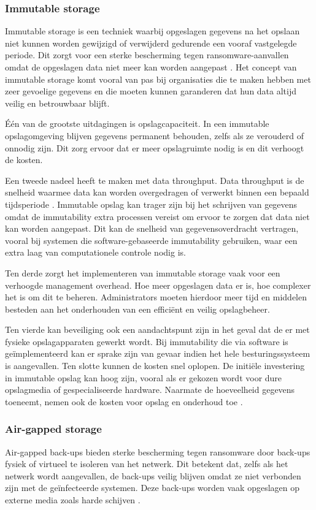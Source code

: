 \subsubsection{Immutable storage}
Immutable storage is een techniek waarbij opgeslagen gegevens na het opslaan niet kunnen worden gewijzigd of verwijderd gedurende een vooraf vastgelegde periode. Dit zorgt voor een sterke bescherming tegen ransomware-aanvallen omdat de opgeslagen data niet meer kan worden aangepast \autocite{Wahl2023}. Het concept van immutable storage komt vooral van pas bij organisaties die te maken hebben met zeer gevoelige gegevens en die moeten kunnen garanderen dat hun data altijd veilig en betrouwbaar blijft. 

Één van de grootste uitdagingen is opslagcapaciteit. In een immutable opslagomgeving blijven gegevens permanent behouden, zelfs als ze verouderd of onnodig zijn. Dit zorg ervoor dat er meer opslagruimte nodig is en dit verhoogt de kosten. 

Een tweede nadeel heeft te maken met data throughput. Data throughput is de snelheid waarmee data kan worden overgedragen of verwerkt binnen een bepaald tijdsperiode \autocite{Miao2016}. Immutable opslag kan trager zijn bij het schrijven van gegevens omdat de immutability extra processen vereist om ervoor te zorgen dat data niet kan worden aangepast. Dit kan de snelheid van gegevensoverdracht vertragen, vooral bij systemen die software-gebaseerde immutability gebruiken, waar een extra laag van computationele controle nodig is. 

Ten derde zorgt het implementeren  van immutable storage vaak voor een verhoogde management overhead. Hoe meer opgeslagen data er is, hoe complexer het is om dit te beheren. Administrators moeten hierdoor meer tijd en middelen besteden aan het onderhouden van een efficiënt en veilig opslagbeheer. 

Ten vierde kan beveiliging ook een aandachtspunt zijn in het geval dat de er met fysieke opslagapparaten gewerkt wordt. Bij immutability die via software is geïmplementeerd kan er sprake zijn van gevaar indien het hele besturingssysteem is aangevallen. Ten slotte kunnen de kosten snel oplopen. De initiële investering in immutable opslag kan hoog zijn, vooral als er gekozen wordt voor dure opslagmedia of gespecialiseerde hardware. Naarmate de hoeveelheid gegevens toeneemt, nemen ook de kosten voor opslag en onderhoud toe \autocite{Hasan2005}.

\subsubsection{Air-gapped storage}
Air-gapped back-ups bieden sterke bescherming tegen ransomware door back-ups fysiek of virtueel te isoleren van het netwerk. Dit betekent dat, zelfs als het netwerk wordt aangevallen, de back-ups veilig blijven omdat ze niet verbonden zijn met de geïnfecteerde systemen. Deze back-ups worden vaak opgeslagen op externe media zoals harde schijven \autocite{Bryant2015}. 

